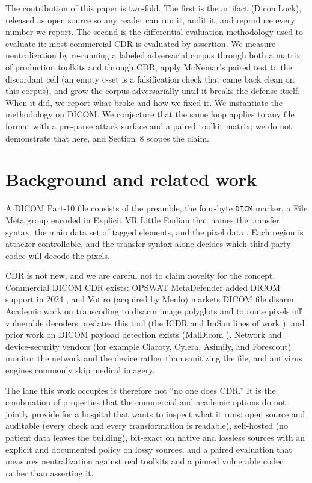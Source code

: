 \documentclass[11pt]{article}
\begin{document}
The contribution of this paper is two-fold. The first is the artifact (DicomLock), released as open source so any reader can run it, audit it, and reproduce every number we report. The second is the differential-evaluation methodology used to evaluate it: most commercial CDR is evaluated by assertion. We measure neutralization by re-running a labeled adversarial corpus through both a matrix of production toolkits and through CDR, apply McNemar's paired test to the discordant cell (an empty c-set is a falsification check that came back clean on this corpus), and grow the corpus adversarially until it breaks the defense itself. When it did, we report what broke and how we fixed it. We instantiate the methodology on DICOM. We conjecture that the same loop applies to any file format with a pre-parse attack surface and a paired toolkit matrix; we do not demonstrate that here, and Section~8 scopes the claim.

\section{Background and related work}

A DICOM Part-10 file consists of the preamble, the four-byte \verb|DICM| marker, a File Meta group encoded in Explicit VR Little Endian that names the transfer syntax, the main data set of tagged elements, and the pixel data \cite{ref20,ref21}. Each region is attacker-controllable, and the transfer syntax alone decides which third-party codec will decode the pixels.

CDR is not new, and we are careful not to claim novelty for the concept. Commercial DICOM CDR exists: OPSWAT MetaDefender added DICOM support in 2024 \cite{ref13}, and Votiro (acquired by Menlo) markets DICOM file disarm \cite{ref14}. Academic work on transcoding to disarm image polyglots and to route pixels off vulnerable decoders predates this tool (the ICDR and ImSan lines of work \cite{ref15,ref16}), and prior work on DICOM payload detection exists (MalDicom \cite{ref17}). Network and device-security vendors (for example Claroty, Cylera, Asimily, and Forescout) monitor the network and the device rather than sanitizing the file, and antivirus engines commonly skip medical imagery.

The lane this work occupies is therefore not ``no one does CDR.'' It is the combination of properties that the commercial and academic options do not jointly provide for a hospital that wants to inspect what it runs: open source and auditable (every check and every transformation is readable), self-hosted (no patient data leaves the building), bit-exact on native and lossless sources with an explicit and documented policy on lossy sources, and a paired evaluation that measures neutralization against real toolkits and a pinned vulnerable codec rather than asserting it.
\end{document}
